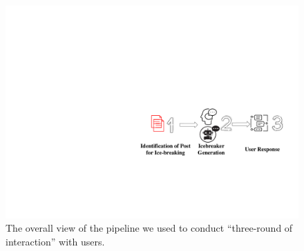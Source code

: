 \begin{figure}[th]
	\centering
	\includegraphics[width=1\columnwidth]{images/pipeline2.pdf}
	\caption{The overall view of the pipeline we used to conduct ``three-round of interaction'' with users.}
\label{fig:pipeline2}
\end{figure}


